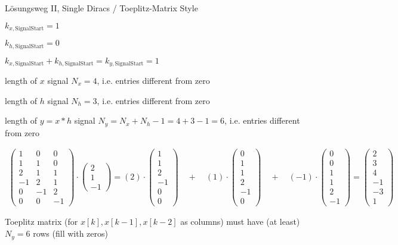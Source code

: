 \documentclass[mathserif, aspectratio=43]{intbeamer}
\begin{document}
\begin{frame}{L\"osungsweg II, Single Diracs / Toeplitz-Matrix Style}

$k_{x,\text{SignalStart}}=1$

$k_{h,\text{SignalStart}}=0$

$k_{x,\text{SignalStart}}+k_{h,\text{SignalStart}}=k_{y,\text{SignalStart}}=1$

length of $x$ signal $N_x=4$, i.e. entries different from zero

length of $h$ signal $N_h=3$, i.e. entries different from zero

length of $y=x \ast h$ signal $N_y=N_x+N_h-1 = 4+3-1=6$, i.e. entries different from zero

\begin{align*}
\begin{pmatrix}
1 & 0 & 0 \\
1 & 1 & 0 \\
2 & 1 & 1 \\
-1 & 2 & 1 \\
0 & -1 & 2 \\
0 & 0 & -1
\end{pmatrix}
\cdot
\begin{pmatrix}
2\\1\\-1
\end{pmatrix}
=
(2) \cdot
\begin{pmatrix}
1\\
1\\
2\\
-1\\
0 \\
0
\end{pmatrix}
\quad+\quad
(1) \cdot
\begin{pmatrix}
0\\
1\\
1\\
2\\
-1\\
0
\end{pmatrix}
\quad+\quad
(-1) \cdot
\begin{pmatrix}
0 \\
0 \\
1 \\
1 \\
2 \\
-1
\end{pmatrix}
=
\begin{pmatrix}
2 \\
3 \\
4 \\
-1 \\
-3 \\
1
\end{pmatrix}
\end{align*}

Toeplitz matrix (for $x[k], x[k-1], x[k-2]$ as columns) must have (at least) $N_y=6$ rows (fill with zeros)

\end{frame}
\end{document}
